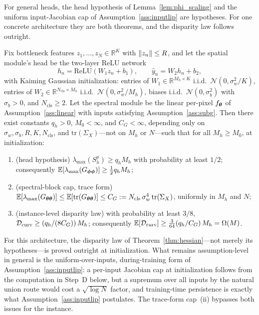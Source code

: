 For general heads, the head hypothesis of Lemma~\ref{lem:phi_scaling} and
the uniform input-Jacobian cap of Assumption~\ref{ass:inputlip} are
hypotheses. For one concrete architecture they are both theorems, and the
disparity law follows outright.

\begin{proposition}
\label{prop:verified_instance}
Fix bottleneck features $z_1, \dots, z_N \in \mathbb{R}^K$ with
$\left\lVert z_n\right\rVert \leq R$, and let the spatial module's head be the two-layer
ReLU network
\[
    h_n = \mathrm{ReLU}(W_1 z_n + b_1),
    \qquad
    \hat{y}_n = W_2 h_n + b_2,
\]
with Kaiming Gaussian initialization: entries of
$W_1 \in \mathbb{R}^{M_h \times K}$ i.i.d.\
$\mathcal{N}(0, \sigma_w^2/K)$, entries of
$W_2 \in \mathbb{R}^{N_{\mathrm{cls}} \times M_h}$ i.i.d.\
$\mathcal{N}(0, \sigma_w^2/M_h)$, biases i.i.d.\
$\mathcal{N}(0, \sigma_b^2)$ with $\sigma_b > 0$, and
$N_{\mathrm{cls}} \geq 2$. Let the spectral module be the linear per-pixel
$f_{\boldsymbol{\theta}}$ of Assumption~\ref{ass:linear} with inputs satisfying
Assumption~\ref{ass:subg}. Then there exist constants $q_h > 0$,
$M_0 < \infty$, and $C_G < \infty$, depending only on
$\sigma_w, \sigma_b, R, K, N_{\mathrm{cls}}$, and
$\mathrm{tr}(\Sigma_X)$---not on $M_h$ or $N$---such that for all
$M_h \geq M_0$, at initialization:
\begin{enumerate}
    \item[(i)] (head hypothesis)
    $\lambda_{\max}(S_h^{p}) \geq q_h M_h$ with probability at least
    $1/2$; consequently
    $\mathbb{E}[\lambda_{\max}(G_{{\boldsymbol{\phi}}{\boldsymbol{\phi}}})] \geq \tfrac{1}{2} q_h M_h$;
    \item[(ii)] (spectral-block cap, trace form)
    $\mathbb{E}[\lambda_{\max}(G_{{\boldsymbol{\theta}}{\boldsymbol{\theta}}})]
    \leq \mathbb{E}[\mathrm{tr}(G_{{\boldsymbol{\theta}}{\boldsymbol{\theta}}})] \leq C_G :=
    N_{\mathrm{cls}}\, \sigma_w^4\, \mathrm{tr}(\Sigma_X)$,
    uniformly in $M_h$ and $N$;
    \item[(iii)] (instance-level disparity law) with probability at least
    $3/8$, $\mathcal{D}_{\mathrm{curv}} \geq \left( q_h / (8 C_G) \right) M_h$; consequently
    $\mathbb{E}[\mathcal{D}_{\mathrm{curv}}] \geq \tfrac{3}{64} (q_h / C_G)\, M_h = \Omega(M)$.
\end{enumerate}
For this architecture, the disparity law of Theorem~\ref{thm:hessian}---not
merely its hypotheses---is proved outright at initialization. What remains
assumption-level in general is the uniform-over-inputs, during-training form
of Assumption~\ref{ass:inputlip}: a per-input Jacobian cap at initialization
follows from the computation in Step~D below, but a supremum over all inputs
by the natural union route would cost a $\sqrt{\log N}$ factor, and
training-time persistence is exactly what Assumption~\ref{ass:inputlip}
postulates. The trace-form cap~(ii) bypasses both issues for the instance.
\end{proposition}

